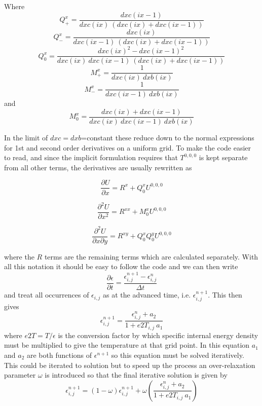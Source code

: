 \documentclass[11pt]{article}
\begin{document}
Where 
\[Q^x_+ = \frac{dxc(ix-1)}{dxc(ix)\  (dxc(ix) + dxc(ix-1)) }\]
\[Q^x_- = \frac{dxc(ix)}{ dxc(ix-1)\  (dxc(ix) + dxc(ix-1)) } \] 
\[Q^x_0 = \frac{dxc(ix)^2 - dxc(ix-1)^2} 
    {dxc(ix) \ dxc(ix-1)\  (dxc(ix) + dxc(ix-1))}\] 
\[M^x_+ = \frac{1}{dxc(ix)\  dxb(ix)} \] 
\[M^x_- = \frac{1}{dxc(ix-1) \ dxb(ix)} \] 
 and 
\[M^x_0=\frac{dxc(ix)+dxc(ix-1)}{dxc(ix)\ dxc(ix-1)\ dxb(ix)} \] 

In the limit of $dxc=dxb$=constant these reduce down to the normal expressions for 1st and second order derivatives on a uniform grid. To make the code easier to read, and since the implicit formulation requires that $T^{0,0,0}$ is kept separate from all other terms, the derivatives are usually rewritten as

\begin{equation}
\frac{\partial U}{\partial x} = R^x + Q^x_0 U^{0,0,0}
\end{equation}

\begin{equation}
\frac{\partial^2 U}{\partial x^2} = R^{xx} + M^x_0 U^{0,0,0}
\end{equation}

\begin{equation}
\frac{\partial^2 U}{\partial x \partial y} = R^{xy} + Q^x_0Q^y_0 U^{0,0,0}
\end{equation}

where the $R$ terms are the remaining terms which are calculated separately. With all this notation it should be easy to follow the code and we can then write 
\[ \frac{\partial \epsilon}{\partial t}=\frac{\epsilon_{i,j}^{n+1} - \epsilon_{i,j}^n}{\Delta t} \]
and treat all occurrences of   $\epsilon_{i,j} $ as at the advanced time, i.e.  $\epsilon_{i,j}^{n+1} $. This then gives
\[ \epsilon_{i,j}^{n+1} = \frac{\epsilon_{i,j}^{n} + a_2}{1+e2T_{i,j}\ a_1} \]
where $e2T = T / \epsilon$ is the conversion factor by which specific internal energy density must be multiplied to give the temperature at that grid point. In this equation $a_1$ and $a_2$ are both functions of $\epsilon^{n+1}$ so this equation must be solved iteratively. This could be iterated to solution but to speed up the process an over-relaxation parameter $\omega$ is introduced so that the final iterative solution is given by
\[ \epsilon_{i,j}^{n+1} = (1-\omega) \epsilon_{i,j}^{n+1} + 
\omega\left(\frac{\epsilon_{i,j}^n + a_2}{1+e2T_{i,j}\ a_1} \right)\] 



\end{document}
